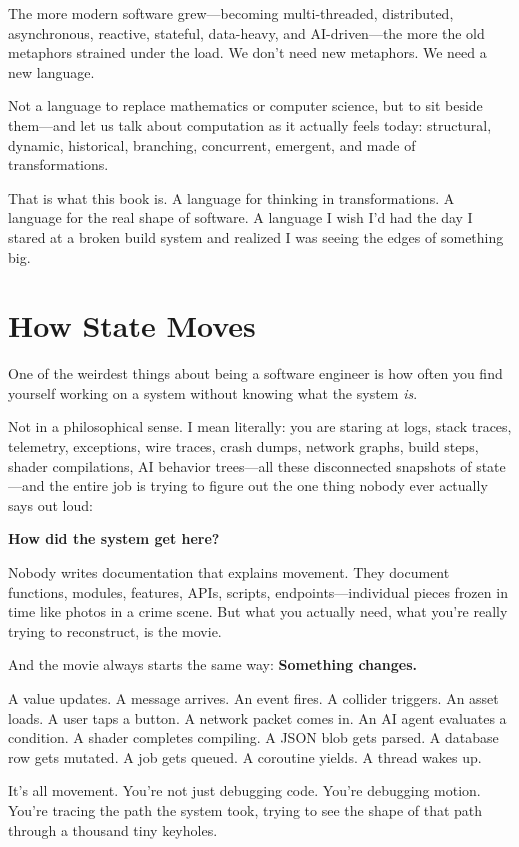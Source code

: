 The more modern software grew—becoming multi-threaded, distributed, asynchronous, reactive, stateful, data-heavy, and AI-driven—the more the old metaphors strained under the load. We don't need new metaphors. We need a new language.

Not a language to replace mathematics or computer science, but to sit beside them—and let us talk about computation as it actually feels today: structural, dynamic, historical, branching, concurrent, emergent, and made of transformations.

That is what this book is. A language for thinking in transformations. A language for the real shape of software. A language I wish I'd had the day I stared at a broken build system and realized I was seeing the edges of something big.

\section{How State Moves}
\label{sec:how-state-moves}

One of the weirdest things about being a software engineer is how often you find yourself working on a system without knowing what the system \textit{is}.

Not in a philosophical sense. I mean literally: you are staring at logs, stack traces, telemetry, exceptions, wire traces, crash dumps, network graphs, build steps, shader compilations, AI behavior trees—all these disconnected snapshots of state—and the entire job is trying to figure out the one thing nobody ever actually says out loud:

\textbf{How did the system get here?}

Nobody writes documentation that explains movement. They document functions, modules, features, APIs, scripts, endpoints—individual pieces frozen in time like photos in a crime scene. But what you actually need, what you're really trying to reconstruct, is the movie.

And the movie always starts the same way: \textbf{Something changes.}

A value updates. A message arrives. An event fires. A collider triggers. An asset loads. A user taps a button. A network packet comes in. An AI agent evaluates a condition. A shader completes compiling. A JSON blob gets parsed. A database row gets mutated. A job gets queued. A coroutine yields. A thread wakes up.

It's all movement. You're not just debugging code. You're debugging motion. You're tracing the path the system took, trying to see the shape of that path through a thousand tiny keyholes.

